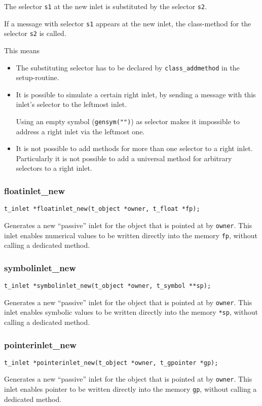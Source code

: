 \documentclass[12pt, a4paper,english,titlepage]{article}
\begin{document}
\begin{appendix}
The selector \verb+s1+ at the new inlet is substituted by the selector \verb+s2+.

If a message with selector \verb+s1+ appears at the new inlet,
the class-method for the selector \verb+s2+ is called.

This means
\begin{itemize}
\item The substituting selector has to be declared by \verb+class_addmethod+
in the setup-routine.
\item It is possible to simulate a certain right inlet, by sending a message with
this inlet's selector to the leftmost inlet.

Using an empty symbol (\verb+gensym("")+) as selector
makes it impossible to address a right inlet via the leftmost one.

\item It is not possible to add methods for more than one selector to a right inlet.
Particularly it is not possible to add a universal method for arbitrary selectors to 
a right inlet.
\end{itemize}

\subsubsection{floatinlet\_new}
\begin{verbatim}
t_inlet *floatinlet_new(t_object *owner, t_float *fp);
\end{verbatim}
Generates a new ``passive'' inlet for the object that is pointed at by \verb+owner+.
This inlet enables numerical values to be written directly into the
memory \verb+fp+, without calling a dedicated method.

\subsubsection{symbolinlet\_new}
\begin{verbatim}
t_inlet *symbolinlet_new(t_object *owner, t_symbol **sp);
\end{verbatim}
Generates a new ``passive'' inlet for the object that is pointed at by \verb+owner+.
This inlet enables symbolic values to be written directly into the
memory \verb+*sp+, without calling a dedicated method.


\subsubsection{pointerinlet\_new}
\begin{verbatim}
t_inlet *pointerinlet_new(t_object *owner, t_gpointer *gp);
\end{verbatim}
Generates a new ``passive'' inlet for the object that is pointed at by \verb+owner+.
This inlet enables pointer to be written directly into the
memory \verb+gp+, without calling a dedicated method.


\end{appendix}
\end{document}
